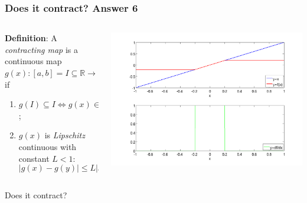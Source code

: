 \documentclass{beamer}
\begin{document}
\begin{frame}
\frametitle{Does it contract? Answer 6}

\begin{columns}
    \begin{column}{0.45\textwidth}
  {\bf Definition}: A \emph{contracting map} is a continuous map
  $g(x) : [a, b] = I \subseteq \mathbb{R} \rightarrow \mathbb{R}$ if
\begin{enumerate}
  \item $g(I) \subseteq I \Leftrightarrow g(x) \in I \, \, \, \forall
    x \in I$;
  \item $g(x)$ is \emph{Lipschitz} continuous with constant $L < 1$:
    \begin{equation*}
      | g(x) - g(y) | \leq L | x - y | \, \, \, \forall x, y \in I.
    \end{equation*}
  \end{enumerate}
\end{column}
\begin{column}{0.55\textwidth}
  \begin{center}
   \includegraphics[width=\textwidth]{figures/cmap9}
  \end{center}
\end{column}
\end{columns}
\begin{overlayarea}{\textwidth}{0.1\textheight}
Does it contract?  
\end{overlayarea}
\end{frame}
\end{document}
